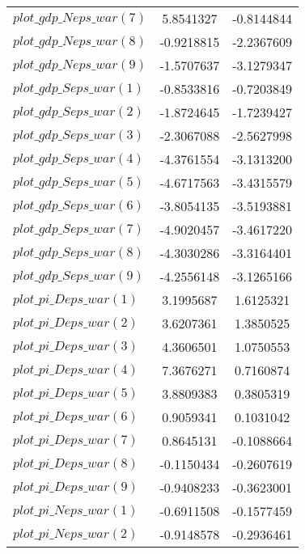 \begin{center}
\begin{longtable}{lcc}
$plot\_gdp\_N eps\_war (7)  $	 & 	      5.8541327	 & 	     -0.8144844 \\ 
$plot\_gdp\_N eps\_war (8)  $	 & 	     -0.9218815	 & 	     -2.2367609 \\ 
$plot\_gdp\_N eps\_war (9)  $	 & 	     -1.5707637	 & 	     -3.1279347 \\ 
$plot\_gdp\_S eps\_war (1)  $	 & 	     -0.8533816	 & 	     -0.7203849 \\ 
$plot\_gdp\_S eps\_war (2)  $	 & 	     -1.8724645	 & 	     -1.7239427 \\ 
$plot\_gdp\_S eps\_war (3)  $	 & 	     -2.3067088	 & 	     -2.5627998 \\ 
$plot\_gdp\_S eps\_war (4)  $	 & 	     -4.3761554	 & 	     -3.1313200 \\ 
$plot\_gdp\_S eps\_war (5)  $	 & 	     -4.6717563	 & 	     -3.4315579 \\ 
$plot\_gdp\_S eps\_war (6)  $	 & 	     -3.8054135	 & 	     -3.5193881 \\ 
$plot\_gdp\_S eps\_war (7)  $	 & 	     -4.9020457	 & 	     -3.4617220 \\ 
$plot\_gdp\_S eps\_war (8)  $	 & 	     -4.3030286	 & 	     -3.3164401 \\ 
$plot\_gdp\_S eps\_war (9)  $	 & 	     -4.2556148	 & 	     -3.1265166 \\ 
$plot\_pi\_D eps\_war (1)   $	 & 	      3.1995687	 & 	      1.6125321 \\ 
$plot\_pi\_D eps\_war (2)   $	 & 	      3.6207361	 & 	      1.3850525 \\ 
$plot\_pi\_D eps\_war (3)   $	 & 	      4.3606501	 & 	      1.0750553 \\ 
$plot\_pi\_D eps\_war (4)   $	 & 	      7.3676271	 & 	      0.7160874 \\ 
$plot\_pi\_D eps\_war (5)   $	 & 	      3.8809383	 & 	      0.3805319 \\ 
$plot\_pi\_D eps\_war (6)   $	 & 	      0.9059341	 & 	      0.1031042 \\ 
$plot\_pi\_D eps\_war (7)   $	 & 	      0.8645131	 & 	     -0.1088664 \\ 
$plot\_pi\_D eps\_war (8)   $	 & 	     -0.1150434	 & 	     -0.2607619 \\ 
$plot\_pi\_D eps\_war (9)   $	 & 	     -0.9408233	 & 	     -0.3623001 \\ 
$plot\_pi\_N eps\_war (1)   $	 & 	     -0.6911508	 & 	     -0.1577459 \\ 
$plot\_pi\_N eps\_war (2)   $	 & 	     -0.9148578	 & 	     -0.2936461 \\ 

\end{longtable}
\end{center}
